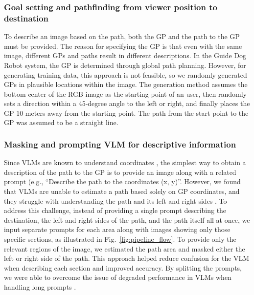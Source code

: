 \subsubsection{Goal setting and pathfinding from viewer position to destination}
\label{sec:GP_and_PP}
To describe an image based on the path, both the GP and the path to the GP must be provided. The reason for specifying the GP is that even with the same image, different GPs and paths result in different descriptions. 
In the Guide Dog Robot system, the GP is determined through global path planning. However, for generating training data, this approach is not feasible, so we randomly generated GPs in plausible locations within the image. The generation method assumes the bottom center of the RGB image as the starting point of an user, then randomly sets a direction within a 45-degree angle to the left or right, and finally places the GP 10 meters away from the starting point.
The path from the start point to the GP was assumed to be a straight line. 

\subsubsection{Masking and prompting VLM for descriptive information}
Since VLMs are known to understand coordinates \cite{liu2023llava}, the simplest way to obtain a description of the path to the GP is to provide an image along with a related prompt (e.g., ``Describe the path to the coordinates (x, y)''. However, we found that VLMs are unable to estimate a path based solely on GP coordinates, and they struggle with understanding the path and its left and right sides \cite{Mert2023}\cite{Shengbang2024}.
To address this challenge, instead of providing a single prompt describing the destination, the left and right sides of the path, and the path itself all at once, we input separate prompts for each area along with images showing only those specific sections, as illustrated in Fig.~\ref{fig:pipeline_flow}. 
To provide only the relevant regions of the image, we estimated the path area and masked either the left or right side of the path. This approach helped reduce confusion for the VLM when describing each section and improved accuracy. By splitting the prompts, we were able to overcome the issue of degraded performance in VLMs when handling long prompts \cite{Han2024lminfinite}\cite{levy2024tasktokensimpactinput}. 

